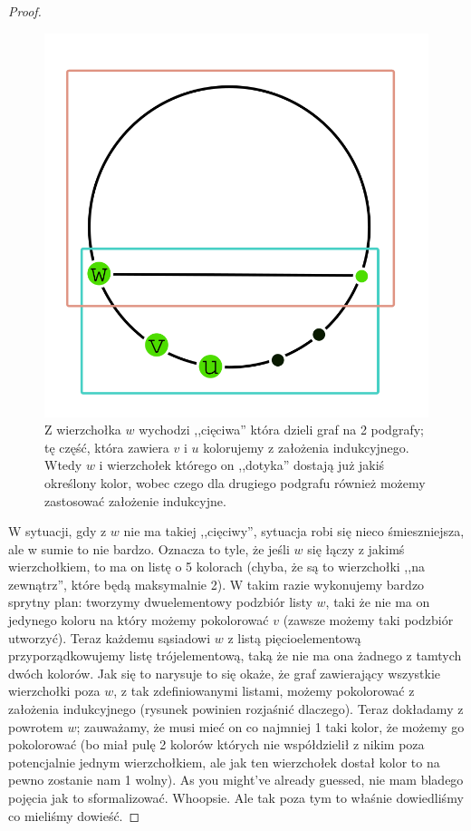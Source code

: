 \begin{proof}
	\begin{figure}[H]
		\centering
		\includegraphics[scale=0.4]{images/5w1.png}
		\caption{Z wierzchołka $w$ wychodzi ,,cięciwa'' która dzieli graf na 2 podgrafy; tę część, która zawiera $v$ i $u$ kolorujemy z założenia indukcyjnego. Wtedy $w$ i wierzchołek którego on ,,dotyka'' dostają już jakiś określony kolor, wobec czego dla drugiego podgrafu również możemy zastosować założenie indukcyjne.}
	\end{figure}

	W sytuacji, gdy z $w$ nie ma takiej ,,cięciwy'', sytuacja robi się nieco śmieszniejsza, ale w sumie to nie bardzo. Oznacza to tyle, że jeśli $w$ się łączy z jakimś wierzchołkiem, to ma on listę o 5 kolorach (chyba, że są to wierzchołki ,,na zewnątrz'', które będą maksymalnie 2). W takim razie wykonujemy bardzo sprytny plan: tworzymy dwuelementowy podzbiór listy $w$, taki że nie ma on jedynego koloru na który możemy pokolorować $v$ (zawsze możemy taki podzbiór utworzyć). Teraz każdemu sąsiadowi $w$ z listą pięcioelementową przyporządkowujemy listę trójelementową, taką że nie ma ona żadnego z tamtych dwóch kolorów. Jak się to narysuje to się okaże, że graf zawierający wszystkie wierzchołki poza $w$, z tak zdefiniowanymi listami, możemy pokolorować z założenia indukcyjnego (rysunek powinien rozjaśnić dlaczego). Teraz dokładamy z powrotem $w$; zauważamy, że musi mieć on co najmniej 1 taki kolor, że możemy go pokolorować (bo miał pulę 2 kolorów których nie współdzielił z nikim poza potencjalnie jednym wierzchołkiem, ale jak ten wierzchołek dostał kolor to na pewno zostanie nam 1 wolny). As you might've already guessed, nie mam bladego pojęcia jak to sformalizować. Whoopsie. Ale tak poza tym to właśnie dowiedliśmy co mieliśmy dowieść.


\end{proof}
